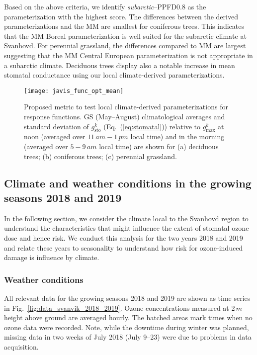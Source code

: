 \documentclass[bg, manuscript]{copernicus}
\begin{document}
Based on the above criteria, we identify \emph{subarctic}--PPFD0.8 as the parameterization with the highest score. The differences between the derived parameterizations and the MM are smallest for coniferous trees. This indicates that the MM Boreal parameterization is well suited for the subarctic climate at Svanhovd. For perennial grassland, the differences compared to MM are largest suggesting that the MM Central European parameterization is not appropriate in a subarctic climate. Deciduous trees display also a notable increase in mean stomatal conductance using our local climate-derived parameterizations.

\begin{figure}[t]
  \texttt{[image: javis\_func\_opt\_mean]}
  \caption{Proposed metric to test local climate-derived parameterizations for response functions. GS (May--August) climatological averages and standard deviation of $g_\mathrm{sto}^k$ (Eq.~(\ref{eq:stomatal})) relative to $g_\mathrm{max}^k$ at noon (averaged over $11\,\unit{am}-1\,\unit{pm}$ local time) and in the morning (averaged over $5-9\,\unit{am}$ local time) are shown for (a) deciduous trees; (b) coniferous trees; (c) perennial grassland.}
  \label{fig:javis_func_opt_mean}
\end{figure}


\subsection{Climate and weather conditions in the growing seasons 2018 and 2019}
\label{subsec:stats}
In the following section, we consider the climate local to the Svanhovd region to understand the characteristics that might influence the extent of stomatal ozone dose and hence risk. We conduct this analysis for the two years 2018 and 2019 and relate these years to seasonality to understand how risk for ozone-induced damage is influence by climate.

\subsubsection{Weather conditions}
\label{subsec:weather}

All relevant data for the growing seasons 2018 and 2019 are shown as time series in Fig.~\ref{fig:data_svanvik_2018_2019}. Ozone concentrations measured at $2\,\unit{m}$ height above ground are averaged hourly. The hatched areas mark times when no ozone data were recorded. Note, while the downtime during winter was planned, missing data in two weeks of July 2018 (July 9--23) were due to problems in data acquisition.
\end{document}

